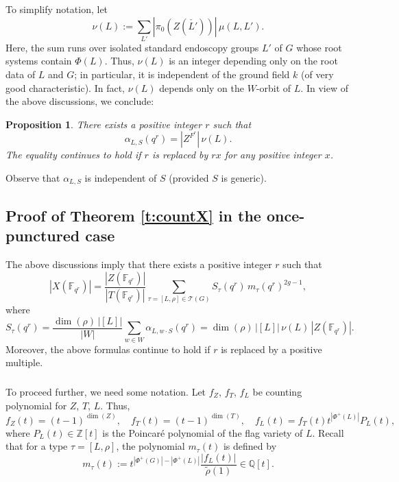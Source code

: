 \documentclass[12pt]{amsart}
\theoremstyle{plain}
\newtheorem{prop}[thm]{Proposition}
\theoremstyle{definition}
\theoremstyle{remark}
\newcommand{\bX}{{X}}
\newcommand{\cT}{\mathcal{T}}
\begin{document}
 
 
 \subsubsection{} To simplify notation, let 
\[
\nu(L):= \sum_{L'} |\pi_0(Z(\check{L'}))| \,  \mu(L, L').
\]
Here, the sum runs over isolated standard endoscopy groups $L'$ of $G$ whose root systems contain $\Phi(L)$.   Thus, $\nu(L)$ is an integer depending only on the root data of $L$ and $G$; in particular, it is independent of the ground field $k$ (of very good characteristic). In fact, $\nu(L)$ depends only on the $W$-orbit of $L$. In view of the above discussions, we conclude:

\begin{prop}\label{p:alpha}  There exists a positive integer $r$ such that 
\[
\alpha_{L,S}(q^r) =  |Z^{F^r}|\,  \nu(L).
\]
The equality continues to hold if $r$ is replaced by $rx$ for any positive integer $x$.
\end{prop} 

Observe that $\alpha_{L,S}$ is independent of $S$ (provided $S$ is generic). 

 
 
\subsection{Proof of Theorem \ref{t:countX} in the once-punctured case} 
The above discussions imply that there exists a positive integer $r$ such that 
\[
|\bX(\mathbb{F}_{q^{r}})| =\frac{|Z(\mathbb{F}_{q^{r}})|}{|T(\mathbb{F}_{q^{r}})|} \sum_{\tau=[L, \rho]\in \cT(G)} S_\tau(q^{r}) \,m_\tau(q^{r})^{2g-1}, 
\]
where 
\[
S_\tau(q^{r}) =  \frac{\dim(\rho)\, |[L]|}{|W|} \sum_{w\in W} \alpha_{L,w\cdot S}(q^{r}) =  \dim(\rho) \, |[L]| \, \nu(L)\,  |Z(\mathbb{F}_{q^{r}})|.  
\]
Moreover, the above formulas continue to hold if $r$ is replaced by a positive multiple. 
\subsubsection{}\label{sss:countingpoly} To proceed further, we need some notation. 
Let $f_Z$,  $f_T$, $f_L$ be counting polynomial for $Z$, $T$, $L$. Thus,
\[
f_Z(t)= (t-1)^{\dim(Z)},\quad f_T(t)=(t-1)^{\dim(T)},\quad f_L(t)=f_T(t) t^{|\Phi^+(L)|} P_L(t), 
\]
where $P_{L}(t)\in \mathbb{Z}[t]$ is the Poincar\'e polynomial of the flag variety of $L$. 
Recall that for a type $\tau=[L,\rho]$, the polynomial $m_\tau(t)$ is defined by \[
 m_\tau(t):= t^{|\Phi^+(G)| - |\Phi^+(L)|} \frac{|f_L(t)|}{\tilde{\rho}(1)}\in \mathbb{Q}[t]. 
 \]
 
\end{document}
